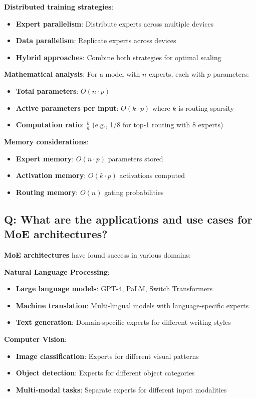 \textbf{Distributed training strategies}:
\begin{itemize}
	\item \textbf{Expert parallelism}: Distribute experts across multiple devices
	\item \textbf{Data parallelism}: Replicate experts across devices
	\item \textbf{Hybrid approaches}: Combine both strategies for optimal scaling
\end{itemize}

\textbf{Mathematical analysis}:
For a model with \(n\) experts, each with \(p\) parameters:
\begin{itemize}
	\item \textbf{Total parameters}: \(O(n \cdot p)\)
	\item \textbf{Active parameters per input}: \(O(k \cdot p)\) where \(k\) is routing sparsity
	\item \textbf{Computation ratio}: \(\frac{k}{n}\) (e.g., 1/8 for top-1 routing with 8 experts)
\end{itemize}

\textbf{Memory considerations}:
\begin{itemize}
	\item \textbf{Expert memory}: \(O(n \cdot p)\) parameters stored
	\item \textbf{Activation memory}: \(O(k \cdot p)\) activations computed
	\item \textbf{Routing memory}: \(O(n)\) gating probabilities
\end{itemize}

\subsection*{Q: What are the applications and use cases for MoE architectures?}
\textbf{MoE architectures} have found success in various domains:

\textbf{Natural Language Processing}:
\begin{itemize}
	\item \textbf{Large language models}: GPT-4, PaLM, Switch Transformers
	\item \textbf{Machine translation}: Multi-lingual models with language-specific experts
	\item \textbf{Text generation}: Domain-specific experts for different writing styles
\end{itemize}

\textbf{Computer Vision}:
\begin{itemize}
	\item \textbf{Image classification}: Experts for different visual patterns
	\item \textbf{Object detection}: Experts for different object categories
	\item \textbf{Multi-modal tasks}: Separate experts for different input modalities
\end{itemize}

